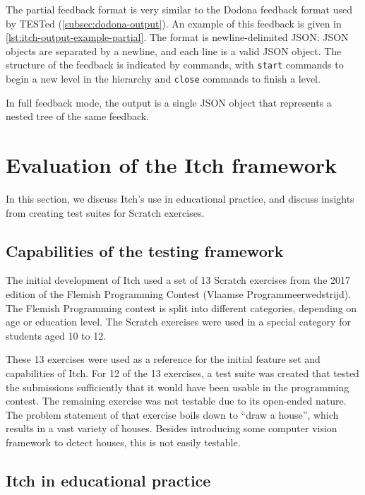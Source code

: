 \documentclass[../main]{subfiles}
\begin{document}
The partial feedback format is very similar to the Dodona feedback format used by TESTed (\cref{subsec:dodona-output}).
An example of this feedback is given in \cref{lst:itch-output-example-partial}.
The format is newline-delimited JSON: JSON objects are separated by a newline, and each line is a valid JSON object.
The structure of the feedback is indicated by commands, with \texttt{start} commands to begin a new level in the hierarchy and \texttt{close} commands to finish a level.

In full feedback mode, the output is a single JSON object that represents a nested tree of the same feedback.

\section{Evaluation of the Itch framework}\label{sec:itch-evaluation}

In this section, we discuss Itch's use in educational practice, and discuss insights from creating test suites for Scratch exercises.

\subsection{Capabilities of the testing framework}\label{subsec:capabilities-of-the-testing-framework}

The initial development of Itch used a set of 13 Scratch exercises from the 2017 edition of the Flemish Programming Contest (\textdutch{Vlaamse Programmeerwedstrijd}).
The Flemish Programming contest is split into different categories, depending on age or education level.
The Scratch exercises were used in a special category for students aged 10 to 12.

These 13 exercises were used as a reference for the initial feature set and capabilities of Itch.
For 12 of the 13 exercises, a test suite was created that tested the submissions sufficiently that it would have been usable in the programming contest.
The remaining exercise was not testable due to its open-ended nature.
The problem statement of that exercise boils down to ``draw a house'', which results in a vast variety of houses.
Besides introducing some computer vision framework to detect houses, this is not easily testable.

\subsection{Itch in educational practice}\label{subsec:itch-in-educational-practice}
\end{document}
